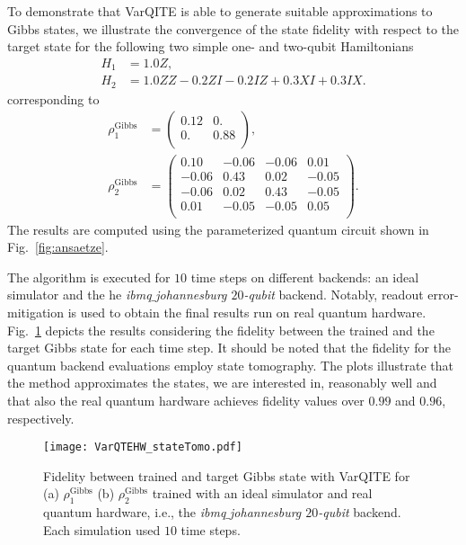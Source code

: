 \documentclass[twocolumn, aps, pra, superscriptaddress, floatfix]{revtex4}
\begin{document}
To demonstrate that VarQITE is able to generate suitable approximations to Gibbs states, we illustrate the convergence of the state fidelity with respect to the target state for the following two simple one- and two-qubit Hamiltonians
\begin{align*}
H_1 &= 1.0 Z, \\
H_2 &= 1.0 ZZ - 0.2 ZI  - 0.2  IZ + 0.3  XI + 0.3  IX.
\end{align*}
corresponding to
\begin{align*}
\rho^{\text{Gibbs}}_1 &= \left( \begin{array}{cc}
0.12 & 0. \\
 0. & 0.88\\\end{array}\right)
, \\
\rho^{\text{Gibbs}}_2 &= \left( \begin{array}{cccc}
0.10 & -0.06 & -0.06 &  0.01 \\
-0.06 &  0.43 &  0.02 & -0.05 \\
-0.06 & 0.02 & 0.43 & -0.05 \\
 0.01 & -0.05 & -0.05 &  0.05\\\end{array}\right).
\end{align*}
The results are computed using the parameterized quantum circuit shown in Fig.~\ref{fig:ansaetze}.

The algorithm is executed for $10$ time steps on different backends: an ideal simulator and the he \emph{ibmq$\_$johannesburg $20$-qubit} backend.
Notably, readout error-mitigation \cite{qiskit, dewes2012readout, Stamatopoulos2019} is used to obtain the final results run on real quantum hardware. Fig.~\ref{fig:VarQITE} depicts the results considering the fidelity between the trained and the target Gibbs state for each time step.
It should be noted that the fidelity for the quantum backend evaluations employ state tomography.
The plots illustrate that the method approximates the states, we are interested in, reasonably well and that also the real quantum hardware achieves fidelity values over $0.99$ and $0.96$, respectively.

\begin{figure}[h!]
\captionsetup{singlelinecheck = false, format= hang, justification=raggedright, font=footnotesize, labelsep=space}
\begin{center}
\texttt{[image: VarQTEHW\_stateTomo.pdf]}
\end{center}
\caption{Fidelity between trained and target Gibbs state with VarQITE for (a) $\rho^{\text{Gibbs}}_1$ (b) $\rho^{\text{Gibbs}}_2$ trained with an ideal simulator and real quantum hardware, i.e., the \emph{ibmq$\_$johannesburg $20$-qubit} backend. Each simulation used $10$ time steps. 
}
\label{fig:VarQITE}
\end{figure}
\end{document}
